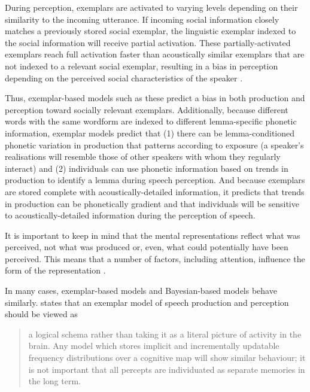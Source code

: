 During perception, exemplars are activated to varying levels depending on their similarity to the incoming utterance.  If incoming social information closely matches a previously stored social exemplar, the linguistic exemplar indexed to the social information will receive partial activation.  These partially-activated exemplars reach full activation faster than acoustically similar exemplars that are not indexed to a relevant social exemplar, resulting in a bias in perception depending on the perceived social characteristics of the speaker \citep{strandjohnson1996,niedzielski1999,haywarrendrager2006}.   
 
Thus, exemplar-based models such as these predict a bias in both production and perception toward socially relevant exemplars. Additionally, because diffe\-rent words with the same wordform are indexed to different lemma-specific phonetic information, exemplar models predict that (1) there can be lemma-con\-di\-tioned phonetic variation in production that patterns according to exposure (a speaker's realisations will resemble those of other speakers with whom they regularly interact) and (2) individuals can use phonetic information based on trends in production to identify a lemma during speech perception.  And because exemplars are stored complete with acoustically-detailed information, it predicts that trends in production can be phonetically gradient and that individuals will be sensitive to acoustically-detailed information during the perception of speech.

It is important to keep in mind that the mental representations reflect what was perceived, not what was produced or, even, what could potentially have been perceived.  This means that a number of factors, including attention, influence the form of the representation \citep{foulkeshay2015}.  

In many cases, exemplar-based models and Bayesian-based models behave si\-milarly.	 \citet{pierrehumbert2002} states that an exemplar model of speech production and perception should be viewed as

\begin{quote}

a logical schema rather than taking it as a literal picture of activity in the brain.  Any model which stores implicit and incrementally updatable frequency distributions over a cognitive map will show similar behaviour; it is not important that all percepts are individuated as separate memories in the long term. \citep[113]{pierrehumbert2002}

\end{quote}

